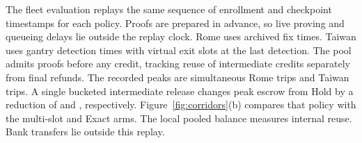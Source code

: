 The fleet evaluation replays the same sequence of enrollment and checkpoint timestamps for each policy. Proofs are prepared in advance, so live proving and queueing delays lie outside the replay clock. Rome uses archived fix times. Taiwan uses gantry detection times with virtual exit slots at the last detection. The pool admits proofs before any credit, tracking reuse of intermediate credits separately from final refunds. The recorded peaks are \RomePeakConcurrent{} simultaneous Rome trips and \TaiwanPeakConcurrent{} Taiwan trips. A single bucketed intermediate release changes peak escrow from Hold by a reduction of \RomeSinglePeakSavings{} and \TaiwanSinglePeakSavings{}, respectively. Figure~\ref{fig:corridors}(b) compares that policy with the multi-slot and Exact arms. The local pooled balance measures internal reuse. Bank transfers lie outside this replay.
